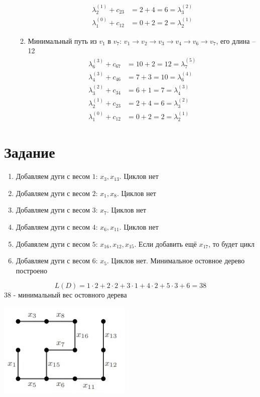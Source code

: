 \documentclass[a4paper, 12pt]{article}
\newcommand{\RNum}[1]{\uppercase\expandafter{\romannumeral #1\relax}}
\begin{document}
\begin{enumerate}
\begin{enumerate}[label*=\arabic*.]
\begin{align*}
                \lambda_2^{(1)} + c_{23} &= 2 + 4 = 6 = \lambda_3^{(2)} \\
                \lambda_1^{(0)} + c_{12} &= 0 + 2 = 2 = \lambda_2^{(1)}
            \end{align*}
            \item Минимальный путь из $v_1$ в $v_7$: $v_1 \rightarrow v_2 \rightarrow v_3 \rightarrow v_4 \rightarrow v_6 \rightarrow v_7$, его длина -- 12
            \begin{align*}
                \lambda_6^{(3)} + c_{67} &= 10 + 2 = 12 = \lambda_7^{(5)} \\
                \lambda_4^{(3)} + c_{46} &= 7 + 3 = 10 = \lambda_6^{(4)} \\
                \lambda_3^{(2)} + c_{34} &= 6 + 1 = 7 = \lambda_4^{(3)} \\
                \lambda_2^{(1)} + c_{23} &= 2 + 4 = 6 = \lambda_3^{(2)} \\
                \lambda_1^{(0)} + c_{12} &= 0 + 2 = 2 = \lambda_2^{(1)}
            \end{align*}
        \end{enumerate}
    \end{enumerate}

\section{Задание \RNum{5}}
\begin{enumerate}
    \item Добавляем дуги с весом $1$: $x_3,x_{13}$. Циклов нет
    \item Добавляем дуги с весом $2$: $x_1, x_8$. Циклов нет
    \item Добавляем дуги с весом $3$: $x_7$. Циклов нет
    \item Добавляем дуги с весом $4$: $x_6, x_{11}$. Циклов нет
    \item Добавялем дуги с весом $5$: $x_{16}, x_{12}, x_{15}$. Если добавить ещё $x_{17}$, то будет цикл
    \item Добавляем дуги с весом $6$: $x_5$. Циклов нет. Минимальное остовное дерево построено
\end{enumerate}
$$ L(D) = 1\cdot2 + 2 \cdot 2 + 3 \cdot 1 + 4 \cdot 2 + 5 \cdot 3 + 6 = 38$$
38 - минимальный вес остовного дерева

\includegraphics{5_tree}
\end{document}
